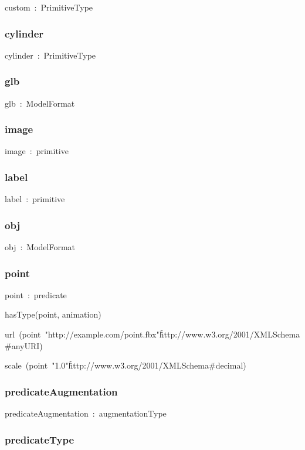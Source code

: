 \documentclass{article}
\begin{document}
custom~:~PrimitiveType

\subsubsection*{cylinder}

cylinder~:~PrimitiveType

\subsubsection*{glb}

glb~:~ModelFormat

\subsubsection*{image}

image~:~primitive

\subsubsection*{label}

label~:~primitive

\subsubsection*{obj}

obj~:~ModelFormat

\subsubsection*{point}

point~:~predicate

hasType(point, animation)

url~(point~"http://example.com/point.fbx"\^\^http://www.w3.org/2001/XMLSchema#anyURI)

scale~(point~"1.0"\^\^http://www.w3.org/2001/XMLSchema#decimal)

\subsubsection*{predicateAugmentation}

predicateAugmentation~:~augmentationType

\subsubsection*{predicateType}
\end{document}
